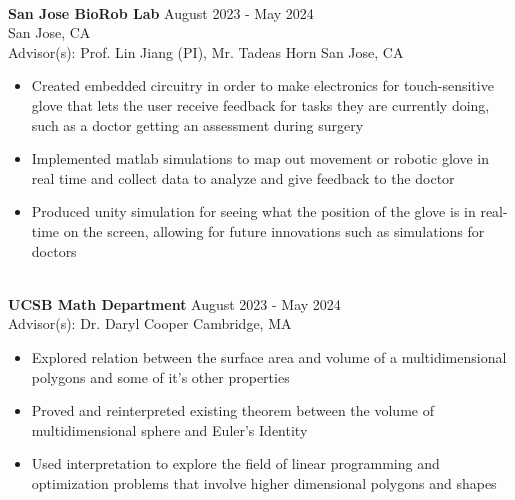 \documentclass[letterpaper,12pt]{article}
\newcommand{\code}[1]{\fontfamily{lmss}\selectfont #1}
\newcommand*\tick{\item[\faAngleRight]}
\begin{document}
\begin{minipage}{18cm}
    \hfill\\ \large\color{black}\code{\textbf{San Jose BioRob Lab}} \hfill August 2023 - May 2024 \\
    \normalsize \code{} \hfill \normalsize San Jose, CA \\
     \small Advisor(s): Prof. Lin Jiang (PI), Mr. Tadeas Horn \hfill \normalsize \color{white} San Jose, CA 

        \color{darkgray}\begin{itemize}
            \tick Created embedded circuitry in order to make electronics for touch-sensitive glove that lets the user receive feedback for tasks they are currently doing, such as a doctor getting an assessment during surgery
            \tick Implemented matlab simulations to map out movement or robotic glove in real time and collect data to analyze and give feedback to the doctor
            \tick Produced unity simulation for seeing what the position of the glove is in real-time on the screen, allowing for future innovations such as simulations for doctors
    \end{itemize} 
\end{minipage}

\newpage

\begin{minipage}{18cm}
    \hfill\\ \large\color{black}\code{\textbf{UCSB Math Department}} \hfill August 2023 - May 2024 \\
     \small Advisor(s): Dr. Daryl Cooper \hfill \normalsize \color{white} Cambridge, MA 
    
    \color{darkgray}\begin{itemize}
        \tick Explored relation between the surface area and volume of a multidimensional polygons and some of it's other properties 
        \tick Proved and reinterpreted existing theorem between the volume of multidimensional sphere and Euler's Identity
        \tick Used interpretation to explore the field of linear programming and optimization problems that involve higher dimensional polygons and shapes
\end{itemize}
    
\end{minipage}
\end{document}
